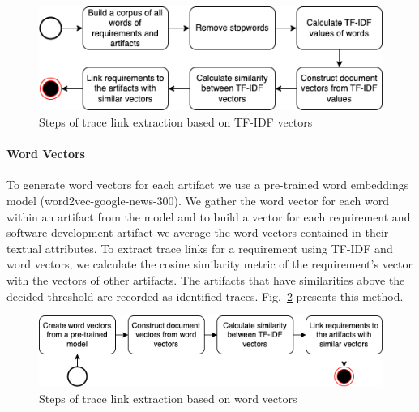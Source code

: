       \begin{figure}[htb]
        \centering
        \includegraphics[width=0.99\linewidth]{figs/tfidfvector2.png}
        \caption{Steps of trace link extraction based on TF-IDF vectors}
        \label{fig:tfidfvec}
      \end{figure}

      \paragraph{Word Vectors} To generate word vectors for each artifact we use a pre-trained word embeddings model (word2vec-google-news-300). We gather the word vector for each word within an artifact from the model and to build a vector for each requirement and software development artifact we average the word vectors contained in their textual attributes. To extract trace links for a requirement using TF-IDF and word vectors, we calculate the cosine similarity metric of the requirement's vector with the vectors of other artifacts. The artifacts that have similarities above the decided threshold are recorded as identified traces. Fig.~\ref{fig:wordvec} presents this method.

       \begin{figure}[htb]
        \centering
        \includegraphics[width=0.99\linewidth]{figs/wordvector.png}
        \caption{Steps of trace link extraction based on word vectors}
        \label{fig:wordvec}
      \end{figure}








